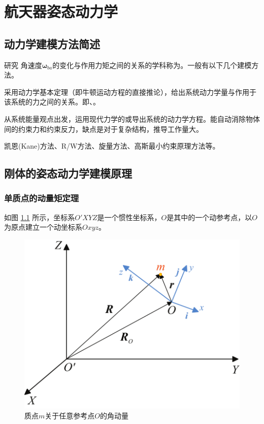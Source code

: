 \chapter{航天器姿态动力学}
\thispagestyle{empty}
\section{动力学建模方法简述}
研究{\color{dy} 角速度$\bm{\omega}_{ba}$的变化与作用力矩之间的关系}的学科称为。一般有以下几个建模方法。
\vspace*{1em}


采用动力学基本定理（即牛顿运动方程的直接推论），给出系统动力学量与作用于该系统的力之间的关系。即、。
\vspace*{1em}



从系统能量观点出发，运用现代力学的或导出系统的动力学方程。能自动消除物体间的约束力和约束反力，缺点是对于复杂结构，推导工作量大。
\vspace*{1em}


\sssection[矢量力学与分析力学的各种变形方法]

凯恩(Kane)方法、R/W方法、旋量方法、高斯最小约束原理方法等。




\section{刚体的姿态动力学建模原理}
\subsection{单质点的动量矩定理}
\sssection[质点的角动量及其导数]

如图 \ref{单质点角动量} 所示，坐标系$O'XYZ$是一个惯性坐标系，$O$是其中的一个动参考点，以$O$为原点建立一个动坐标系$Oxyz$。

\begin{figure}[!htb]
    \centering
    \includegraphics[width=0.4\linewidth]{pic/单质点角动量}
    \vspace*{-1em}
    \caption{质点$m$关于任意参考点$O$的角动量}
    \label{单质点角动量}
\end{figure}

